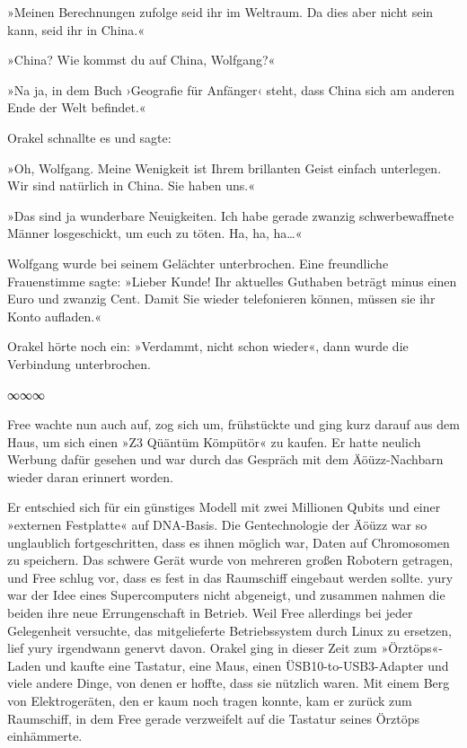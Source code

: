 »Meinen Berechnungen zufolge seid ihr im Weltraum. Da dies aber nicht sein kann, seid ihr in China.«

»China? Wie kommst du auf China, Wolfgang?«

»Na ja, in dem Buch ›Geografie für Anfänger‹ steht, dass China sich am anderen Ende der Welt befindet.«

Orakel schnallte es und sagte:

»Oh, Wolfgang. Meine Wenigkeit ist Ihrem brillanten Geist einfach unterlegen. Wir sind natürlich in China. Sie haben uns.«

»Das sind ja wunderbare Neuigkeiten. Ich habe gerade zwanzig schwerbewaffnete Männer losgeschickt, um euch zu töten. Ha, ha, ha…«

Wolfgang wurde bei seinem Gelächter unterbrochen. Eine freundliche Frauenstimme sagte: »Lieber Kunde! Ihr aktuelles Guthaben beträgt minus einen Euro und zwanzig Cent. Damit Sie wieder telefonieren können, müssen sie ihr Konto aufladen.«

Orakel hörte noch ein: »Verdammt, nicht schon wieder«, dann wurde die Verbindung unterbrochen.

\begin{center}
    ∞∞∞
\end{center}

Free wachte nun auch auf, zog sich um, frühstückte und ging kurz darauf aus dem Haus, um sich einen »Z3 Qüäntüm Kömpütör« zu kaufen. Er hatte neulich Werbung dafür gesehen und war durch das Gespräch mit dem Äöüzz-Nachbarn wieder daran erinnert worden.

Er entschied sich für ein günstiges Modell mit zwei Millionen Qubits und einer »externen Festplatte« auf DNA-Basis. Die Gentechnologie der Äöüzz war so unglaublich fortgeschritten, dass es ihnen möglich war, Daten auf Chromosomen zu speichern. Das schwere Gerät wurde von mehreren großen Robotern getragen, und Free schlug vor, dass es fest in das Raumschiff eingebaut werden sollte. yury war der Idee eines Supercomputers nicht abgeneigt, und zusammen nahmen die beiden ihre neue Errungenschaft in Betrieb. Weil Free allerdings bei jeder Gelegenheit versuchte, das mitgelieferte Betriebssystem durch Linux zu ersetzen, lief yury irgendwann genervt davon. Orakel ging in dieser Zeit zum »Örztöps«-Laden und kaufte eine Tastatur, eine Maus, einen ÜSB10-to-USB3-Adapter und viele andere Dinge, von denen er hoffte, dass sie nützlich waren. Mit einem Berg von Elektrogeräten, den er kaum noch tragen konnte, kam er zurück zum Raumschiff, in dem Free gerade verzweifelt auf die Tastatur seines Örztöps einhämmerte.


